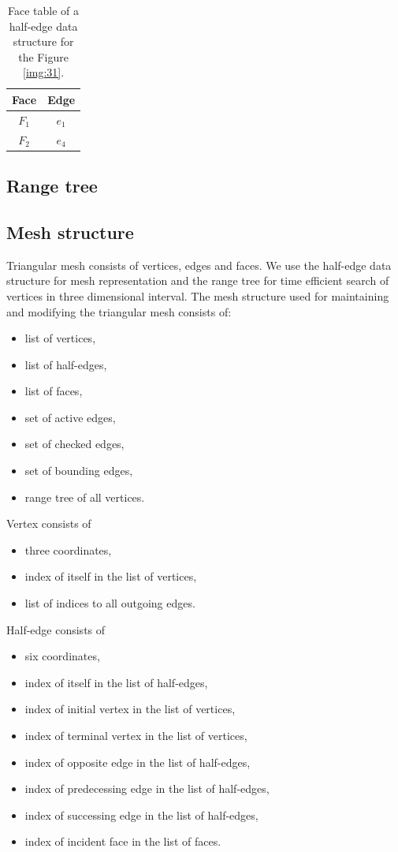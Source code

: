 \begin{table}[]
    \centering
    \begin{tabular}{|c|c|}
    \hline
    \hline
    Face  & Edge            \\ \hline\hline
    $F_1$ & $e_1$           \\ \hline
    $F_2$ & $e_4$           \\ \hline\hline
    \end{tabular}
\caption{Face table of a half-edge data structure for the Figure \ref{img:31}.}
\label{tab:7}
\end{table}


\subsection{Range tree}
\subsection{Mesh structure}
Triangular mesh consists of vertices, edges and faces. We use the half-edge 
data structure for mesh representation and the range tree for time efficient
search of vertices in three dimensional interval.
The mesh structure used for maintaining and modifying the triangular mesh
consists of:
\begin{itemize}
    \setlength\itemsep{-2mm}
    \item list of vertices,
    \item list of half-edges,
    \item list of faces,
    \item set of active edges,
    \item set of checked edges,
    \item set of bounding edges,
    \item range tree of all vertices.
\end{itemize}
Vertex consists of 
\begin{itemize}
    \setlength\itemsep{-2mm}
    \item three coordinates,
    \item index of itself in the list of vertices,
    \item list of indices to all outgoing edges.
\end{itemize}
Half-edge consists of 
\begin{itemize}
    \setlength\itemsep{-2mm}
    \item six coordinates,
    \item index of itself in the list of half-edges,
    \item index of initial vertex in the list of vertices, 
    \item index of terminal vertex in the list of vertices,
    \item index of opposite edge in the list of half-edges,
    \item index of predecessing edge in the list of half-edges,
    \item index of successing edge in the list of half-edges,
    \item index of incident face in the list of faces.
\end{itemize}
